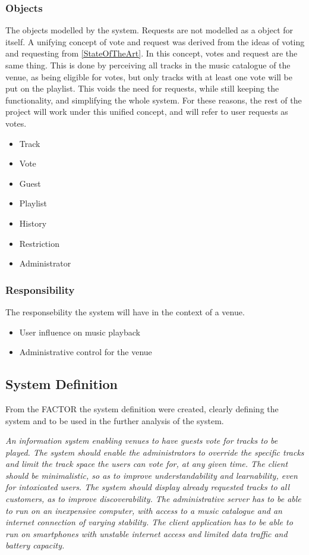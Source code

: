 \subsubsection{Objects}
The objects modelled by the system.
Requests are not modelled as a object for itself. A unifying concept of vote and request was derived from the ideas of voting and requesting from \cref{StateOfTheArt}. In this concept, votes and request are the same thing. This is done by perceiving all tracks in the music catalogue of the venue, as being eligible for votes, but only tracks with at least one vote will be put on the playlist. This voids the need for requests, while still keeping the functionality, and simplifying the whole system. For these reasons, the rest of the project will work under this unified concept, and will refer to user requests as votes.
\begin{itemize}
  \item Track
  \item Vote
  \item Guest
  \item Playlist
  \item History
  \item Restriction
  \item Administrator
\end{itemize}

\subsubsection{Responsibility}
The responsebility the system will have in the context of a venue.
\begin{itemize}
  \item User influence on music playback
  \item Administrative control for the venue
\end{itemize}

\subsection{System Definition}\label{sub:systemDefinition}
From the FACTOR the system definition were created, clearly defining the system and to be used in the further analysis of the system.

\begin{center}
\textit{An information system enabling venues to have guests vote for tracks to be played. The system should enable the administrators to override the specific tracks and limit the track space the users can vote for, at any given time. The client should be minimalistic, so as to improve understandability and learnability, even for intoxicated users. The system should display already requested tracks to all customers, as to improve discoverability.
The administrative server has to be able to run on an inexpensive computer, with access to a music catalogue and an internet connection of varying stability. The client application has to be able to run on smartphones with unstable internet access and limited data traffic and battery capacity.}
\end{center}
